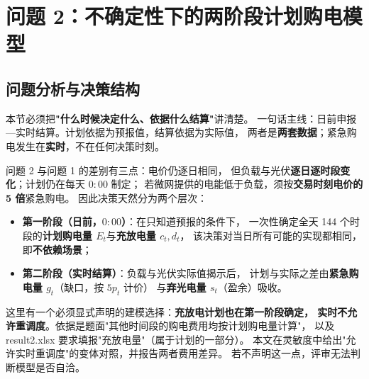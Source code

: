 
\section{问题 2：不确定性下的两阶段计划购电模型}

\subsection{问题分析与决策结构}

\begin{guideblock}
本节必须把\textbf{"什么时候决定什么、依据什么结算"}讲清楚。
一句话主线：日前申报—实时结算。计划依据为预报值，结算依据为实际值，
两者是\textbf{两套数据}；紧急购电发生在\textbf{实时}，不在任何决策时刻。
\end{guideblock}

问题 2 与问题 1 的差别有三点：电价仍逐日相同，
但负载与光伏\textbf{逐日逐时段变化}；计划仍在每天 \(0{:}00\) 制定；
若微网提供的电能低于负载，须按\textbf{交易时刻电价的 5 倍}紧急购电。
因此决策天然分为两个层次：

\begin{itemize}
  \item \textbf{第一阶段（日前，\(0{:}00\)）}：在只知道预报的条件下，
        一次性确定全天 144 个时段的\textbf{计划购电量 \(E_t\)}与\textbf{充放电量 \(c_t,d_t\)}，
        该决策对当日所有可能的实现都相同，即\textbf{不依赖场景}；
  \item \textbf{第二阶段（实时结算）}：负载与光伏实际值揭示后，
        计划与实际之差由\textbf{紧急购电量 \(g_t\)}（缺口，按 \(5p_t\) 计价）
        与\textbf{弃光电量 \(s_t\)}（盈余）吸收。
\end{itemize}

\begin{guideblock}
这里有一个必须显式声明的建模选择：\textbf{充放电计划也在第一阶段确定，
实时不允许重调度}。依据是题面"其他时间段的购电费用均按计划购电量计算"，
以及 result2.xlsx 要求填报"充放电量"（属于计划的一部分）。
本文在灵敏度中给出"允许实时重调度"的变体对照，并报告两者费用差异。
若不声明这一点，评审无法判断模型是否自洽。
\end{guideblock}

